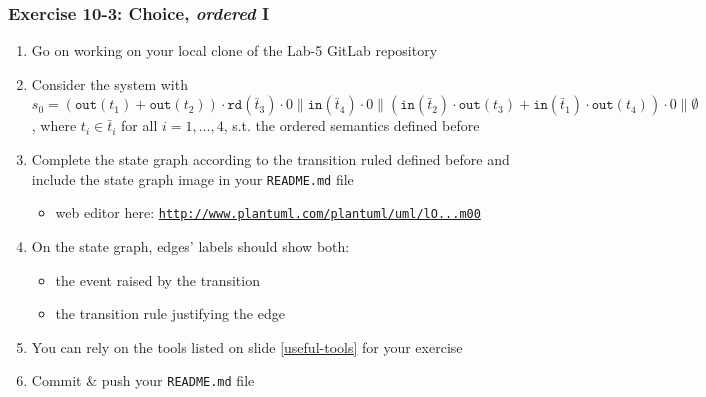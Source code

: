 \documentclass[presentation]{beamer}\mode<presentation>{\usetheme{AMSCesenaPurpleAndGold}}
\begin{document}
\begin{frame}
\frametitle{Exercise 10-3: Choice, \emph{ordered} I}
    \begin{enumerate}
        \item Go on working on your local clone of the Lab-5 GitLab repository
        
        \vfill
        
        \item Consider the system with \alert{$s_0 = (\mathtt{out}(t_1) + \mathtt{out}(t_2)) \cdot \mathtt{rd}(\bar{t}_3) \cdot 0 \parallel \mathtt{in}(\bar{t}_4) \cdot 0 \parallel (\mathtt{in}(\bar{t}_2) \cdot \mathtt{out}(t_3) + \mathtt{in}(\bar{t}_1) \cdot \mathtt{out}(t_4)) \cdot 0  \parallel \emptyset$}, where $t_i \in \bar{t}_i$ for all $i = 1,\ldots,4$, s.t. the \alert{ordered} \linda{} semantics defined before
        
        \vfill
    
        \item Complete the state graph according to the transition ruled defined before and include the state graph image in your \alert{\texttt{README.md}} file
        \begin{itemize}
            \item web editor here: \href{
                http://www.plantuml.com/plantuml/uml/lO_1JW8n48RlVOeviXB8mf4GGbmnUj43yOGS6ZfYGxVTj5CLZGSg9ho8R-DJx9EuiDeWuQgtQV_ld_-VeIDkoUUAkONK1RSyXpEyurxHkT4qbiy8tNHF71Cdt4cqL0YIk98pTznznNE4p7WhqR9xAH0mBsW90jtCoeAaqMpFwRQh0LuOm2cVBURMU2qoeupjzqTQI3qV3C0e-O37Y1kDJqKreQYe9Ifb7jahOvEJARHQ0t0fs-slXXuqZAS6bM6LG1E-vv0aRIiQzBakmrlIJg7SV83KzSVwy2CaxTfNiyqehA8GFUNcdRcqRj7fGSo-rPFiuleo6rMFQIIwaGW7nCy17VXzRG_-flUsP0pj_bzeO4FKmkVg2m00
            }{\texttt{http://www.plantuml.com/plantuml/uml/lO...m00}}
        \end{itemize}
        
        \vfill
        
        \item On the state graph, edges' labels should show both:
        \begin{itemize}
            \item the event raised by the transition
            \item the transition rule justifying the edge
        \end{itemize}
        
        \vfill
        
        \item You can rely on the tools listed on slide \ref{useful-tools} for your exercise
        
        \vfill
        
        \item Commit \& push your \texttt{README.md} file
        
    \end{enumerate}
    
\end{frame}
\end{document}

